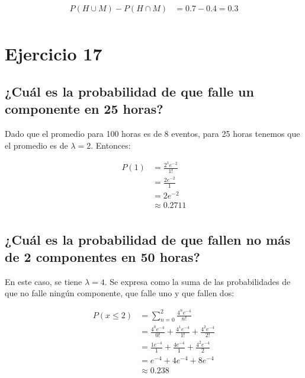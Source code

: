 \documentclass[letterpaper,12pt]{memoir}
\theoremstyle{definition}
\begin{document}
\begin{equation}
  \begin{split}
    P(H\cup M) - P(H\cap M) &= 0.7 - 0.4 = 0.3\\
  \end{split}
\end{equation}

\section*{Ejercicio 17}

\subsection*{¿Cuál es la probabilidad de que falle un componente en 25 horas?}

Dado que el promedio para 100 horas es de 8 eventos, para 25 horas tenemos que el promedio es de \(\lambda = 2\). Entonces:

\begin{equation*}
	\begin{split}
	P(1) &= \frac{2^1e^{-2}}{1!}\\
	&= \frac{2e^{-2}}{1}\\
	&= 2e^{-2}\\
	&\approx 0.2711\\
	\end{split}
\end{equation*}


\subsection*{¿Cuál es la probabilidad de que fallen no más de 2 componentes en 50 horas?}

En este caso, se tiene \(\lambda = 4\). Se expresa como la suma de las probabilidades de que no falle ningún componente, que falle uno y que fallen dos:

\begin{equation*}
  \begin{split}
  P(x\leq2)&= \sum_{n=0}^{2} \frac{4^ne^{-4}}{n!}\\
   &= \frac{4^0e^{-4}}{0!} + \frac{4^1e^{-4}}{1!} + \frac{4^2e^{-4}}{2!}\\
  &= \frac{1 e^{-4}}{1} + \frac{4e^{-4}}{1} + \frac{4^2e^{-4}}{2}\\
  &= e^{-4} + 4e^{-4} + 8e^{-4}\\
  &\approx 0.238\\
  \end{split}
\end{equation*}
\end{document}
